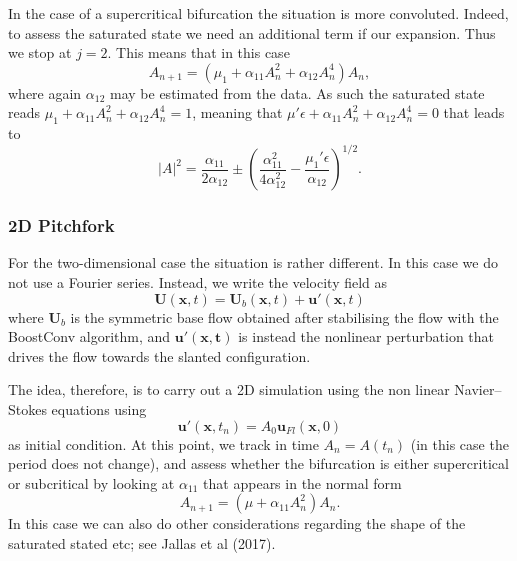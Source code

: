 \documentclass[onecolumn,notitlepage,superscriptaddress, amsmath,amssymb,longbibliographyaps,floatfix]{revtex4-1}
\begin{document}
In the case of a supercritical bifurcation the situation is more convoluted. Indeed, to assess the saturated state we need an additional term if our expansion. Thus we stop at $j=2$. This means that in this case
%
\begin{equation}
  A_{n+1} = \left( \mu_1 + \alpha_{11}A_n^2 + \alpha_{12} A_n^4 \right) A_n,
\end{equation}
%
where again $\alpha_{12}$ may be estimated from the data.
As such the saturated state reads $\mu_1 + \alpha_{11} A_n^2 + \alpha_{12} A_n^4 = 1$, meaning that $\mu' \epsilon + \alpha_{11} A_n^2 + \alpha_{12} A_n^4 = 0$ that leads to
%
\begin{equation}
  |A|^2 = \frac{\alpha_{11}}{2 \alpha_{12}} \pm \left( \frac{\alpha_{11}^2}{4 \alpha_{12}^2} - \frac{\mu_1' \epsilon}{\alpha_{12}} \right)^{1/2}.
\end{equation}

\subsubsection{2D Pitchfork}

For the two-dimensional case the situation is rather different. In this case we do not use a Fourier series. Instead, we write the velocity field as
%
\begin{equation}
\bm{U}(\bm{x},t) = \bm{U}_b(\bm{x},t) + \bm{u}'(\bm{x},t)
\end{equation}
%
where $\bm{U}_b$ is the symmetric base flow obtained after stabilising the flow with the BoostConv algorithm, and $\bm{u}'(\bm{x,t})$ is instead the nonlinear perturbation that drives the flow towards the slanted configuration.

The idea, therefore, is to carry out a 2D simulation using the non linear Navier--Stokes equations using
%
\begin{equation}
  \bm{u}'(\bm{x},t_n) = A_0 \bm{u}_{Fl}(\bm{x},0)
\end{equation}
%
as initial condition. At this point, we track in time $A_n=A(t_n)$ (in this case the period does not change), and assess whether the bifurcation is either supercritical or subcritical by looking at $\alpha_{11}$ that appears in the normal form
%
\begin{equation}
 A_{n+1} = \left( \mu + \alpha_{11} A_n^2 \right) A_n.
\end{equation}
%
In this case we can also do other considerations regarding the shape of the saturated stated etc; see Jallas et al (2017).
\end{document}

